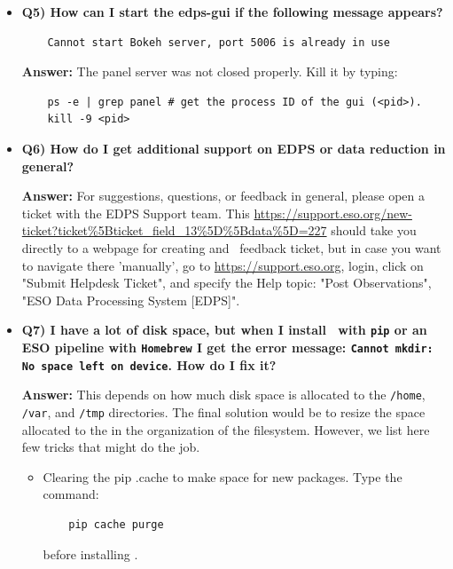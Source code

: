 \begin{itemize}
\item {\bf Q5) How can I start the edps-gui if the following message appears?}
\begin{verbatim}
	Cannot start Bokeh server, port 5006 is already in use
\end{verbatim}


{\bf Answer:} The panel server was not closed properly. Kill it by typing:
\begin{verbatim}
   	ps -e | grep panel # get the process ID of the gui (<pid>).
   	kill -9 <pid>
\end{verbatim}

\item {\bf Q6) How do I get additional support on EDPS or data reduction in general?}

{\bf Answer:} For suggestions, questions, or feedback in general, please open a ticket with the EDPS Support
team. This 
\href{https://support.eso.org/new-ticket?ticket%5Bticket_field_13%5D%5Bdata%5D=227}
{https://support.eso.org/new-ticket?ticket\%5Bticket\_field\_13\%5D\%5Bdata\%5D=227}
should take you directly to a webpage for creating and \edps\ feedback ticket, but
in case you want to navigate there ’manually’, go to \href{https://support.eso.org}{https://support.eso.org}, login, click on
"Submit Helpdesk Ticket", and specify the Help topic: "Post Observations", "ESO Data Processing
System [EDPS]".

\item {\bf Q7) I have a lot of disk space, but when I install \edps\ with {\tt pip} or an ESO pipeline with {\tt Homebrew} I get the error message: {\tt Cannot mkdir: No space left on device}. How do I fix it?}

{\bf Answer:} This depends on how much disk space is allocated to the {\tt /home}, {\tt /var}, and {\tt /tmp} directories. The final solution would be
to resize the space allocated to the in the organization of the filesystem. However, we list here few tricks that might do the job.
\begin{itemize}
   \item  Clearing the pip .cache to make space for new packages. Type the command:
\begin{verbatim}
    pip cache purge
\end{verbatim}
   before installing \edps.


\end{itemize}
\end{itemize}
